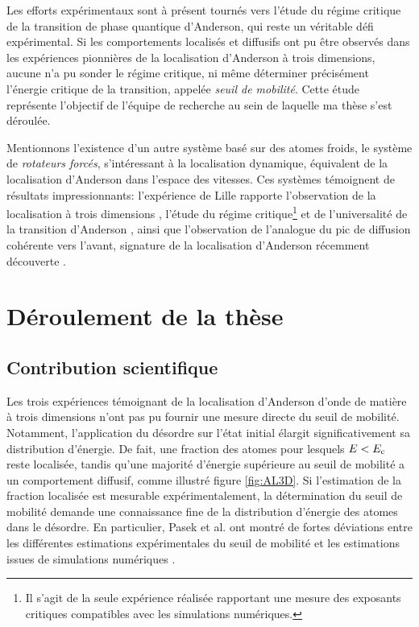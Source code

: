 Les efforts expérimentaux sont à présent tournés vers l'étude du régime critique de la transition de phase quantique d'Anderson, qui reste un véritable défi expérimental. Si les comportements localisés et diffusifs ont pu être observés dans les expériences pionnières de la localisation d'Anderson à trois dimensions, aucune n'a pu sonder le régime critique, ni même déterminer précisément l'énergie critique de la transition, appelée \emph{seuil de mobilité}. Cette étude représente l'objectif de l'équipe de recherche au sein de laquelle ma thèse s'est déroulée.

Mentionnons l'existence d'un autre système basé sur des atomes froids, le système de \emph{rotateurs forcés}, s'intéressant à la localisation dynamique, équivalent de la localisation d'Anderson dans l'espace des vitesses. Ces systèmes témoignent de résultats impressionnants: l'expérience de Lille rapporte l'observation de la localisation à trois dimensions \citep{chabe2008experimental}, l'étude du régime critique\footnote{Il s'agit de la seule expérience réalisée rapportant une mesure des exposants critiques compatibles avec les simulations numériques.} et de l'universalité de la transition d'Anderson \citep{lopez2012experimental}, ainsi que l'observation de l'analogue du pic de diffusion cohérente vers l'avant, signature de la localisation d'Anderson récemment découverte \citep{hainaut2018controlling}.


\section{Déroulement de la thèse}

\subsection{Contribution scientifique}
Les trois expériences témoignant de la localisation d'Anderson d'onde de matière à trois dimensions n'ont pas pu fournir une mesure directe du seuil de mobilité. Notamment, l'application du désordre sur l'état initial élargit significativement sa distribution d'énergie. De fait, une fraction des atomes pour lesquels $E<E_{\mathrm{c}}$ reste localisée, tandis qu'une majorité d'énergie supérieure au seuil de mobilité a un comportement diffusif, comme illustré figure \ref{fig:AL3D}. Si l'estimation de la fraction localisée est mesurable expérimentalement, la détermination du seuil de mobilité demande une connaissance fine de la distribution d'énergie des atomes dans le désordre. En particulier, Pasek et al. ont montré de fortes déviations entre les différentes estimations expérimentales du seuil de mobilité et les estimations issues de simulations numériques \citep{pasek2017anderson}.

